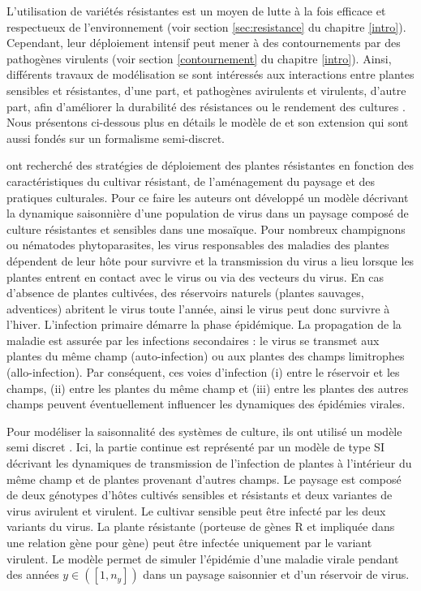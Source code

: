 	L'utilisation de variétés résistantes est un moyen de lutte à la fois efficace et respectueux de l'environnement (voir section \ref{sec:resistance} du chapitre \ref{intro}). Cependant, leur déploiement intensif peut mener à des contournements par des pathogènes virulents (voir section \ref{contournement} du chapitre \ref{intro}). Ainsi, différents travaux de modélisation se sont intéressés aux interactions entre plantes sensibles et résistantes, d'une part, et pathogènes avirulents et virulents, d'autre part, afin d'améliorer la durabilité des résistances ou le rendement des cultures \citep{vandenBosch2003,Fabre2012,Papaix2014,Fabre2015,Lof2017,Djidjou-Demasse2017}. 
Nous présentons ci-dessous plus en détails le modèle de \citet{Fabre2012} et son extension \citet{Djidjou-Demasse2017} qui sont aussi fondés sur un formalisme semi-discret.
	
	\citet{Fabre2012} ont recherché des stratégies de déploiement des plantes résistantes en fonction des caractéristiques du cultivar résistant, de l'aménagement du paysage et des pratiques culturales. Pour ce faire les auteurs ont développé un modèle décrivant la dynamique saisonnière d'une population de virus dans un paysage composé de culture résistantes et sensibles  dans une  mosaïque.
Pour  nombreux champignons ou nématodes phytoparasites, les virus responsables des maladies des plantes dépendent de leur hôte pour survivre et  la transmission du virus  a lieu lorsque les plantes  entrent en contact avec le virus ou via des vecteurs du virus. En cas d'absence de plantes cultivées, des réservoirs naturels (plantes sauvages, adventices) abritent le virus toute l'année, ainsi le virus peut donc survivre à l'hiver. L'infection primaire  démarre la phase épidémique. La propagation de la maladie est assurée par les infections secondaires : le virus se transmet aux plantes du même champ (auto-infection) ou  aux plantes des champs limitrophes (allo-infection).  Par conséquent, ces voies d'infection (i) entre le réservoir et les champs, (ii) entre les plantes du  même champ et (iii)  entre les plantes des autres champs peuvent éventuellement influencer les dynamiques des épidémies virales.
	
	Pour modéliser la saisonnalité des systèmes de culture, ils ont utilisé un modèle semi discret \citep{Mailleret2009}.  Ici, la partie continue est représenté par un modèle de type SI décrivant les dynamiques de transmission de l'infection de plantes à l'intérieur du même champ et  de plantes provenant d'autres champs.  Le paysage est composé de deux génotypes d'hôtes cultivés sensibles  et résistants   et deux variantes de virus avirulent  et virulent. Le cultivar sensible peut être infecté par les deux variants du virus. La plante résistante (porteuse de gènes R et impliquée dans une relation gène pour gène) peut être infectée uniquement par le variant virulent.  Le modèle permet de simuler l'épidémie d'une maladie virale pendant des années $y \in ([1,n_y])$ dans un paysage saisonnier et d'un réservoir de virus.  
		
